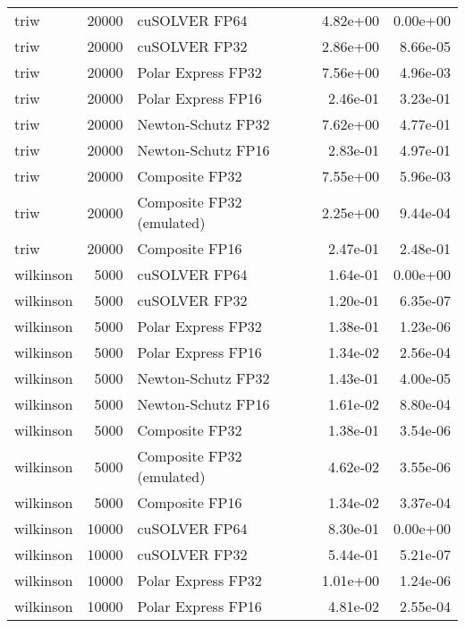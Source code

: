 \begin{table}
\begin{tabular}{lrlrr}
     triw & 20000 &             cuSOLVER FP64 &  4.82e+00 &        0.00e+00 \\
     triw & 20000 &             cuSOLVER FP32 &  2.86e+00 &        8.66e-05 \\
     triw & 20000 &        Polar Express FP32 &  7.56e+00 &        4.96e-03 \\
     triw & 20000 &        Polar Express FP16 &  2.46e-01 &        3.23e-01 \\
     triw & 20000 &        Newton-Schutz FP32 &  7.62e+00 &        4.77e-01 \\
     triw & 20000 &        Newton-Schutz FP16 &  2.83e-01 &        4.97e-01 \\
     triw & 20000 &            Composite FP32 &  7.55e+00 &        5.96e-03 \\
     triw & 20000 & Composite FP32 (emulated) &  2.25e+00 &        9.44e-04 \\
     triw & 20000 &            Composite FP16 &  2.47e-01 &        2.48e-01 \\
wilkinson &  5000 &             cuSOLVER FP64 &  1.64e-01 &        0.00e+00 \\
wilkinson &  5000 &             cuSOLVER FP32 &  1.20e-01 &        6.35e-07 \\
wilkinson &  5000 &        Polar Express FP32 &  1.38e-01 &        1.23e-06 \\
wilkinson &  5000 &        Polar Express FP16 &  1.34e-02 &        2.56e-04 \\
wilkinson &  5000 &        Newton-Schutz FP32 &  1.43e-01 &        4.00e-05 \\
wilkinson &  5000 &        Newton-Schutz FP16 &  1.61e-02 &        8.80e-04 \\
wilkinson &  5000 &            Composite FP32 &  1.38e-01 &        3.54e-06 \\
wilkinson &  5000 & Composite FP32 (emulated) &  4.62e-02 &        3.55e-06 \\
wilkinson &  5000 &            Composite FP16 &  1.34e-02 &        3.37e-04 \\
wilkinson & 10000 &             cuSOLVER FP64 &  8.30e-01 &        0.00e+00 \\
wilkinson & 10000 &             cuSOLVER FP32 &  5.44e-01 &        5.21e-07 \\
wilkinson & 10000 &        Polar Express FP32 &  1.01e+00 &        1.24e-06 \\
wilkinson & 10000 &        Polar Express FP16 &  4.81e-02 &        2.55e-04 \\

\end{tabular}
\end{table}

